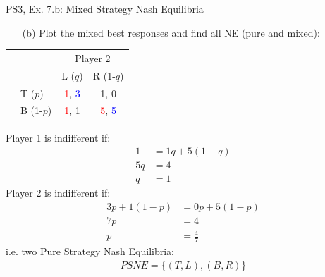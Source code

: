\begin{frame}{PS3, Ex. 7.b: Mixed Strategy Nash Equilibria}
  \begin{multicols}{2}
    \begin{itemize}
      \item[(b)] Plot the mixed best responses and find all NE (pure and mixed):
    \end{itemize}
    \begin{table}
      \begin{tabular}{cl|c|c|}
        & \multicolumn{1}{c}{} & \multicolumn{2}{c}{\color{blue}Player 2}\\
        \parbox[t]{1mm}{}
        &  &  &  \\
        & T  ($p$)  & \textcolor{red}{1}, \textcolor{blue}{3} & 1, 0 \\
        & B  (1-$p$)& \textcolor{red}{1}, 1 & \textcolor{red}{5}, \textcolor{blue}{5} \\
      \end{tabular}
    \end{table}
    Player 1 is indifferent if:
    \begin{align*}
      1 &= 1q + 5(1-q) \\
      5q&= 4          \\
      q &= 1
    \end{align*}
    Player 2 is indifferent if:
    \begin{align*}
      3p + 1(1-p)&= 0p+5(1-p)\\
      7p         &= 4     \\
      p          &= \frac{4}{7}
    \end{align*}
    i.e. two Pure Strategy Nash Equilibria:
    \begin{align*}
      PSNE=\{(T,L),(B,R)\}
    \end{align*}
  \vfill\null \columnbreak

\end{multicols}
\end{frame}
